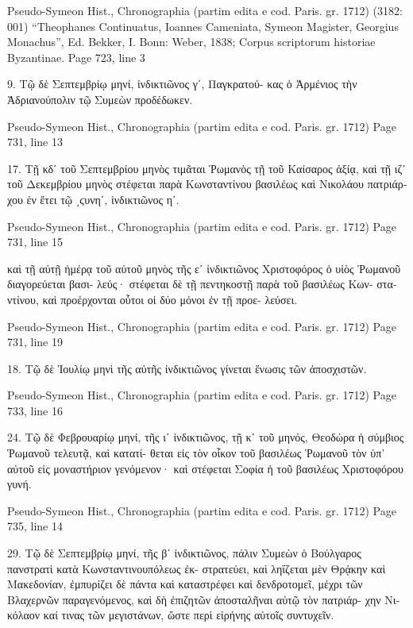 \documentclass[12pt,letterpaper,twoside,final]{memoir}
\begin{document}
\begin{greek}
Pseudo-Symeon Hist., Chronographia (partim edita e cod. Paris. gr. 1712) (3182: 001)
“Theophanes Continuatus, Ioannes Cameniata, Symeon Magister, Georgius Monachus”, Ed. Bekker, I.
Bonn: Weber, 1838; Corpus scriptorum historiae Byzantinae.
Page 723, line 3

9. Τῷ δὲ Σεπτεμβρίῳ μηνί, ἰνδικτιῶνος γʹ, Παγκρατού-
κας ὁ Ἀρμένιος τὴν Ἀδριανούπολιν τῷ Συμεὼν προδέδωκεν. 



Pseudo-Symeon Hist., Chronographia (partim edita e cod. Paris. gr. 1712) 
Page 731, line 13

17. Τῇ κδʹ τοῦ Σεπτεμβρίου μηνὸς τιμᾶται Ῥωμανὸς τῇ 
τοῦ Καίσαρος ἀξίᾳ, καὶ τῇ ιζʹ τοῦ Δεκεμβρίου μηνὸς στέφεται 
παρὰ Κωνσταντίνου βασιλέως καὶ Νικολάου πατριάρχου ἐν ἔτει 
τῷ ͵ϛυνηʹ, ἰνδικτιῶνος ηʹ. 



Pseudo-Symeon Hist., Chronographia (partim edita e cod. Paris. gr. 1712) 
Page 731, line 15

                            καὶ τῇ αὐτῇ ἡμέρᾳ τοῦ αὐτοῦ μηνὸς τῆς 
εʹ ἰνδικτιῶνος Χριστοφόρος ὁ υἱὸς Ῥωμανοῦ διαγορεύεται βασι-
λεύς· στέφεται δὲ τῇ πεντηκοστῇ παρὰ τοῦ βασιλέως Κων-
σταντίνου, καὶ προέρχονται οὗτοι οἱ δύο μόνοι ἐν τῇ προε-
λεύσει. 



Pseudo-Symeon Hist., Chronographia (partim edita e cod. Paris. gr. 1712) 
Page 731, line 19

18. Τῷ δὲ Ἰουλίῳ μηνὶ τῆς αὐτῆς ἰνδικτιῶνος γίνεται 
ἕνωσις τῶν ἀποσχιστῶν. 



Pseudo-Symeon Hist., Chronographia (partim edita e cod. Paris. gr. 1712) 
Page 733, line 16

24. Τῷ δὲ Φεβρουαρίῳ μηνί, τῆς ιʹ ἰνδικτιῶνος, τῇ κʹ 
τοῦ μηνός, Θεοδώρα ἡ σύμβιος Ῥωμανοῦ τελευτᾷ, καὶ κατατί-
θεται εἰς τὸν οἶκον τοῦ βασιλέως Ῥωμανοῦ τὸν ὑπ' αὐτοῦ εἰς 
μοναστήριον γενόμενον· καὶ στέφεται Σοφία ἡ τοῦ βασιλέως 
Χριστοφόρου γυνή. 



Pseudo-Symeon Hist., Chronographia (partim edita e cod. Paris. gr. 1712) 
Page 735, line 14

29. Τῷ δὲ Σεπτεμβρίῳ μηνί, τῆς βʹ ἰνδικτιῶνος, πάλιν 
Συμεὼν ὁ Βούλγαρος πανστρατὶ κατὰ Κωνσταντινουπόλεως ἐκ-
στρατεύει, καὶ ληΐζεται μὲν Θρᾴκην καὶ Μακεδονίαν, ἐμπυρίζει 
δὲ πάντα καὶ καταστρέφει καὶ δενδροτομεῖ, μέχρι τῶν Βλαχερνῶν 
παραγενόμενος, καὶ δὴ ἐπιζητῶν ἀποσταλῆναι αὐτῷ τὸν πατριάρ-
χην Νικόλαον καί τινας τῶν μεγιστάνων, ὥστε περὶ εἰρήνης αὐτοῖς 
συντυχεῖν. 




\end{greek}
\end{document}
